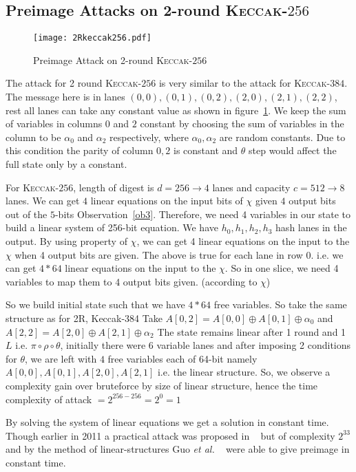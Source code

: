 \documentclass[runningheads]{llncs}
\newcommand{\KECCAK}{\mbox{\textsc{Keccak}}}
\newcommand{\etal}{\textit{et al. }}
\begin{document}
\subsection{Preimage Attacks on 2-round \KECCAK-$256$}
    \begin{figure}
        \centering
        \texttt{[image: 2Rkeccak256.pdf]}
        \caption{Preimage Attack on 2-round \KECCAK-$256$}
        \label{fig:2rkeccak256}
    \end{figure}
	The attack for 2 round \KECCAK-$256$ is very similar to the attack for \KECCAK-$384$.
	The message here is in lanes $(0, 0), (0, 1), (0, 2), (2, 0), (2, 1), (2, 2)$, rest all lanes can take any constant value as shown in figure~\ref{fig:2rkeccak256}. We keep the sum of variables in columns $0$ and $2$ constant by choosing the sum of variables in the column to be $\alpha_0$ and $\alpha_2$ respectively, where $\alpha_0, \alpha_2$ are random constants. Due to this condition the parity of column $0, 2$ is constant and $\theta$ step would affect the full state only by a constant.
	
	For \KECCAK-$256$, length of digest is $d = 256 \rightarrow 4$ lanes and capacity $c = 512 \rightarrow 8$ lanes. We can get $4$ linear equations on the input bits of $\chi$ given $4$ output bits out of the $5$-bits Observation~\ref{ob3}. Therefore, we need 4 variables in our state to build a linear system of 256-bit equation.	We have $h_0, h_1, h_2, h_3$  hash lanes in the output. By using property of $\chi$, we can get 4 linear equations on the input to the $\chi$ when 4 output bits are given. The above is true for each lane in row 0. i.e. we can get $4*64$ linear equations on the input to the $\chi$. So in one slice, we need 4 variables to map them to 4 output bits given. (according to $\chi$) 
	
	So we build initial state such that we have $4*64$ free variables. So take the same structure as for 2R, Keccak-384
	Take $A[0, 2] = A[0, 0] \oplus A[0, 1] \oplus \alpha_0$
	and $A[2, 2] = A[2, 0] \oplus A[2, 1] \oplus \alpha_2$
	The state remains linear after 1 round and 1 $L$ i.e. $\pi \circ \rho \circ \theta$, initially there were 6 variable lanes and after imposing 2 conditions for $\theta$, we are left with $4$ free variables each of 64-bit namely $A[0,0], A[0,1], A[2, 0], A[2,1]$ i.e. the linear structure.
	So, we observe a complexity gain over bruteforce by size of linear structure, hence the time complexity of attack $ = 2^{256 - 256} = 2^{0} = 1$
	
	By solving the system of linear equations we get a solution in constant time. Though earlier in 2011 a practical attack was proposed in ~\cite{naya2011practical} but of complexity $2^{33}$ and by the method of linear-structures Guo \etal ~\cite{guo2016linear} were able to give preimage in constant time.
\end{document}
